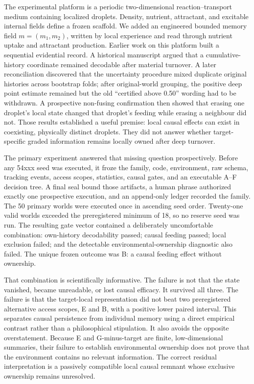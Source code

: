 \documentclass[11pt]{article}
\begin{document}
The experimental platform is a periodic two-dimensional reaction--transport medium containing localized droplets. Density, nutrient, attractant, and excitable internal fields define a frozen scaffold. We added an engineered bounded memory field $m=(m_1,m_2)$, written by local experience and read through nutrient uptake and attractant production. Earlier work on this platform built a sequential evidential record. A historical manuscript argued that a cumulative-history coordinate remained decodable after material turnover. A later reconciliation discovered that the uncertainty procedure mixed duplicate original histories across bootstrap folds; after original-world grouping, the positive deep point estimate remained but the old ``certified above 0.50'' wording had to be withdrawn. A prospective non-fusing confirmation then showed that erasing one droplet's local state changed that droplet's feeding while erasing a neighbour did not. Those results established a useful premise: local causal effects can exist in coexisting, physically distinct droplets. They did not answer whether target-specific graded information remains locally owned after deep turnover.

The primary experiment answered that missing question prospectively. Before any 54xxx seed was executed, it froze the family, code, environment, raw schema, tracking events, access scopes, statistics, causal gates, and an executable A--F decision tree. A final seal bound those artifacts, a human phrase authorized exactly one prospective execution, and an append-only ledger recorded the family. The 50 primary worlds were executed once in ascending seed order. Twenty-one valid worlds exceeded the preregistered minimum of 18, so no reserve seed was run. The resulting gate vector contained a deliberately uncomfortable combination: own-history decodability passed; causal feeding passed; local exclusion failed; and the detectable environmental-ownership diagnostic also failed. The unique frozen outcome was B: a causal feeding effect without ownership.

That combination is scientifically informative. The failure is not that the state vanished, became unreadable, or lost causal efficacy. It survived all three. The failure is that the target-local representation did not beat two preregistered alternative access scopes, E and B, with a positive lower paired interval. This separates causal persistence from individual memory using a direct empirical contrast rather than a philosophical stipulation. It also avoids the opposite overstatement. Because E and G-minus-target are finite, low-dimensional summaries, their failure to establish environmental ownership does not prove that the environment contains no relevant information. The correct residual interpretation is a passively compatible local causal remnant whose exclusive ownership remains unresolved.
\end{document}
